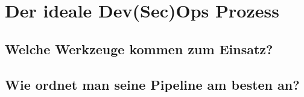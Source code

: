 \chapter{Der \glqq ideale\grqq{} Dev(Sec)Ops Prozess}

\section{Welche Werkzeuge kommen zum Einsatz?}
\section{Wie ordnet man seine Pipeline am besten an?}